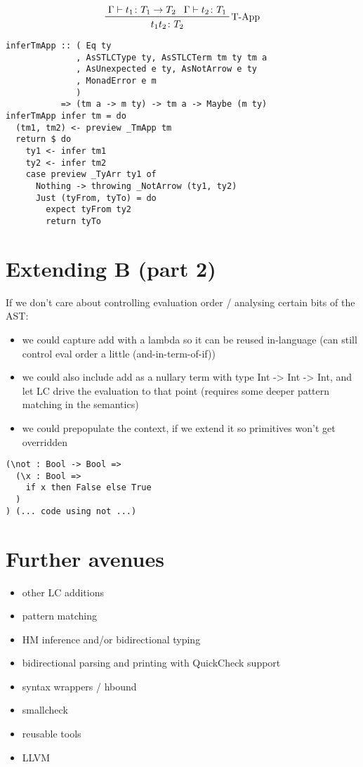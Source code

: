 \documentclass{beamer}
\begin{document}
\begin{frame}[fragile]
  \begin{displaymath}  
    \prftree[r]{T-App}
    {\Gamma \vdash t_1 \colon T_1 \rightarrow T_2}
    {\Gamma \vdash t_2 \colon T_1}
    {t_1 t_2 \colon T_2}
  \end{displaymath}  
  \begin{verbatim}
inferTmApp :: ( Eq ty
              , AsSTLCType ty, AsSTLCTerm tm ty tm a
              , AsUnexpected e ty, AsNotArrow e ty
              , MonadError e m
              )
           => (tm a -> m ty) -> tm a -> Maybe (m ty)
inferTmApp infer tm = do
  (tm1, tm2) <- preview _TmApp tm
  return $ do
    ty1 <- infer tm1
    ty2 <- infer tm2
    case preview _TyArr ty1 of
      Nothing -> throwing _NotArrow (ty1, ty2)
      Just (tyFrom, tyTo) = do
        expect tyFrom ty2
        return tyTo
  \end{verbatim}  
\end{frame}

\section{Extending B (part 2)}

\begin{frame}[c]
If we don't care about controlling evaluation order / analysing certain bits of
the AST:
\begin{itemize}
\item we could capture add with a lambda so it can be reused in-language (can
  still control eval order a little (and-in-term-of-if))
\item we could also include add as a nullary term with type Int -> Int -> Int, and let LC drive the
  evaluation to that point (requires some deeper pattern matching in the semantics)
\item we could prepopulate the context, if we extend it so primitives won't get overridden
\end{itemize}
\end{frame}

\begin{frame}[fragile]
  \begin{verbatim}
(\not : Bool -> Bool => 
  (\x : Bool => 
    if x then False else True
  )
) (... code using not ...)
  \end{verbatim}  
\end{frame}

\section{Further avenues}

\begin{frame}[c]
\begin{itemize}
\item other LC additions
\item pattern matching
\item HM inference and/or bidirectional typing
\item bidirectional parsing and printing with QuickCheck support
\item syntax wrappers / hbound
\item smallcheck
\item reusable tools 
\item LLVM
\end{itemize}
\end{frame}
\end{document}
